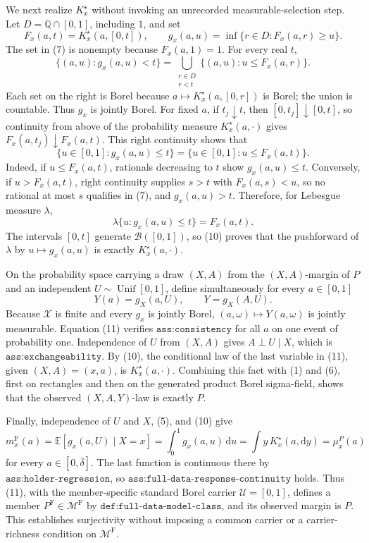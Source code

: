 We next realize \(K_x^\star\) without invoking an unrecorded measurable-selection step.  Let \(D=\mathbb Q\cap[0,1]\), including \(1\), and set
\[
 F_x(a,t)=K_x^\star(a,[0,t]),
 \qquad
 g_x(a,u)=\inf\{r\in D:F_x(a,r)\geq u\}.
 \tag{7}
\]
The set in (7) is nonempty because \(F_x(a,1)=1\).  For every real \(t\),
\[
 \{(a,u):g_x(a,u)<t\}
 =\bigcup_{\substack{r\in D\\r<t}}
   \{(a,u):u\leq F_x(a,r)\}.
 \tag{8}
\]
Each set on the right is Borel because \(a\mapsto K_x^\star(a,[0,r])\) is Borel; the union is countable.  Thus \(g_x\) is jointly Borel.  For fixed \(a\), if \(t_j\downarrow t\), then \([0,t_j]\downarrow[0,t]\), so continuity from above of the probability measure \(K_x^\star(a,\cdot)\) gives \(F_x(a,t_j)\downarrow F_x(a,t)\).  This right continuity shows that
\[
 \{u\in[0,1]:g_x(a,u)\leq t\}
 =\{u\in[0,1]:u\leq F_x(a,t)\}.
 \tag{9}
\]
Indeed, if \(u\leq F_x(a,t)\), rationals decreasing to \(t\) show \(g_x(a,u)\leq t\).  Conversely, if \(u>F_x(a,t)\), right continuity supplies \(s>t\) with \(F_x(a,s)<u\), so no rational at most \(s\) qualifies in (7), and \(g_x(a,u)>t\).  Therefore, for Lebesgue measure \(\lambda\),
\[
 \lambda\{u:g_x(a,u)\leq t\}=F_x(a,t).
 \tag{10}
\]
The intervals \([0,t]\) generate \(\mathcal B([0,1])\), so (10) proves that the pushforward of \(\lambda\) by \(u\mapsto g_x(a,u)\) is exactly \(K_x^\star(a,\cdot)\).

On the probability space carrying a draw \((X,A)\) from the \((X,A)\)-margin of \(P\) and an independent \(U\sim\operatorname{Unif}[0,1]\), define simultaneously for every \(a\in[0,1]\)
\[
 Y(a)=g_X(a,U),
 \qquad
 Y=g_X(A,U).
 \tag{11}
\]
Because \(\mathcal X\) is finite and every \(g_x\) is jointly Borel, \((a,\omega)\mapsto Y(a,\omega)\) is jointly measurable.  Equation (11) verifies \(\texttt{ass:consistency}\) for all \(a\) on one event of probability one.  Independence of \(U\) from \((X,A)\) gives \(A\perp U\mid X\), which is \(\texttt{ass:exchangeability}\).  By (10), the conditional law of the last variable in (11), given \((X,A)=(x,a)\), is \(K_x^\star(a,\cdot)\).  Combining this fact with (1) and (6), first on rectangles and then on the generated product Borel sigma-field, shows that the observed \((X,A,Y)\)-law is exactly \(P\).

Finally, independence of \(U\) and \(X\), (5), and (10) give
\[
 m_x^{\mathrm F}(a)
 =\mathbb E[g_x(a,U)\mid X=x]
 =\int_0^1g_x(a,u)\,\mathrm du
 =\int y\,K_x^\star(a,\mathrm dy)
 =\mu_x^P(a)
 \tag{12}
\]
for every \(a\in[0,\bar\delta]\).  The last function is continuous there by \(\texttt{ass:holder-regression}\), so \(\texttt{ass:full-data-response-continuity}\) holds.  Thus (11), with the member-specific standard Borel carrier \(\mathcal U=[0,1]\), defines a member \(P^{\mathrm F}\in\mathcal M^{\mathrm F}\) by \(\texttt{def:full-data-model-class}\), and its observed margin is \(P\).  This establishes surjectivity without imposing a common carrier or a carrier-richness condition on \(\mathcal M^{\mathrm F}\).

